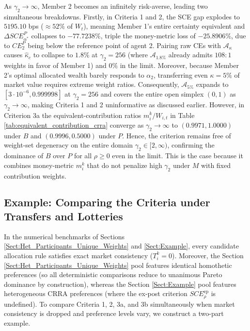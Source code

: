 \begin{itemize}
    As $\gamma_2 \to \infty$, Member 2 becomes an infinitely risk-averse, leading two simultaneous breakdowns. Firstly, in Criteria 1 and 2, the SCE gap explodes to $5195.10$ bps ($\approx 52\%$ of $W_t$), meaning Member 1's entire certainty equivalent and $\Delta SCE_{\alpha^*}^P$ collapses to $-77.7238\%$, triple the money-metric loss of $-25.8906\%$, due to $CE_2^P$ being below the reference point of agent 2. Pairing raw CEs with $\mathcal{A}_\kappa$ causes $\hat{\kappa}_c$ to collapse to $1.8\%$ at $\gamma_2 = 256$ (where $\mathcal{A}_{1.8\%}$ already admits $108:1$ weights in favor of Member 1) and $0\%$ in the limit. Moreover, because Member 2's optimal allocated wealth barely responds to $\alpha_2$, transferring even $\kappa = 5\%$ of market value requires extreme weight ratios. Consequently, $\mathcal{A}_{5\%}$ expands to $[3 \cdot 10^{-6}, 0.999998]$ at $\gamma_2 = 256$ and covers the entire open simplex $(0,1)$ as $\gamma_2 \to \infty$, making Criteria 1 and 2 uninformative as discussed earlier. However, in Criterion 3a the equivalent-contribution ratios $m_i^k / W_{i,t}$ in Table \ref{tab:equivalent_contribution_crra} converge as $\gamma_2 \to \infty$ to $(0.9971, 1.0000)$ under $B$ and $(0.9996, 0.5000)$ under $P$. Hence, the criterion remains free of weight-set degeneracy on the entire domain $\gamma_2 \in [2, \infty)$, confirming the dominance of $B$ over $P$ for all $\rho \geq 0$ even in the limit. This is the case because it combines money-metric $m_i^k$ that do not penalize high $\gamma_2$ under $M$ with fixed contribution weights.
\end{itemize}

\subsection{Example: Comparing the Criteria under Transfers and Lotteries}
\label{Subsect:Example_Synthesis}

In the numerical benchmarks of Sections \ref{Sect:Het_Participants_Unique_Weights} and \ref{Sect:Example}, every candidate allocation rule satisfies exact market consistency ($T_i^k = 0$). Moreover, the Section \ref{Sect:Het_Participants_Unique_Weights} pool features identical homothetic preferences (so all deterministic comparisons reduce to unanimous Pareto dominance by construction), whereas the Section \ref{Sect:Example} pool features heterogeneous CRRA preferences (where the ex-post criterion $SCE_\rho^{\text{ep}}$ is undefined). To compare Criteria 1, 2, 3a, and 3b simultaneously when market consistency is dropped and preference levels vary, we construct a two-part example.

